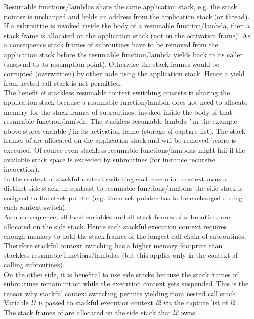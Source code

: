 Resumable functions/lambdas share the same application stack, e.g. the stack
pointer is unchanged and holds an address from the application stack (\main or
thread).\\
If a subroutine is invoked inside the body of a resumable function/lambda, then
a stack frame is allocated on the application stack (not on the activation
frame)! As a consequence stack frames of subroutines have to be removed from the
application stack before the resumable function/lambda yields back to its caller
(suspend to its resumption point). Otherwise the stack frames would be corrupted
(overwritten) by other code using the application stack. Hence a yield from
nested call stack is not permitted.\\
The benefit of stackless resumable context switching consists in sharing the
application stack because a resumable function/lambda does not need to allocate
memory for the stack frames of subroutines, invoked inside the body of that
resumable function/lambda.
The stackless resumable lambda \textit{l} in the example above stores variable 
\textit{j} in its activation frame (storage of capture list). The stack frames of
 are allocated on the application stack and will be removed
before \yield is executed.
\newline
Of course even stackless resumable functions/lambdas might fail if the available
stack space is exceeded by subroutines (for instance recursive invocation).\\
\newline
In the context of stackful context switching each execution context owns a
distinct side stack. In contrast to resumable functions/lambdas the side stack
is assigned to the stack pointer (e.g. the stack pointer has to be exchanged
during each context switch).\\
As a consequence, all local variables and all stack frames of subroutines are
allocated on the side stack. Hence each stackful execution context requires
enough memory to hold the stack frames of the longest call chain of subroutines.
Therefore stackful context switching has a higher memory footprint than
stackless resumable functions/lambdas (but this applies only in the context of
calling subroutines).\\
On the other side, it is benefital to use side stacks because the stack frames
of subroutines remain intact while the execution context gets suspended. This is
the reason why stackful context switching permits yielding from nested call
stack.
Variable \textit{l1} is passed to stackful execution context \textit{l2} via
the capture list of \textit{l2}. The stack frames of  are
allocated on the side stack that \textit{l2} owns.
